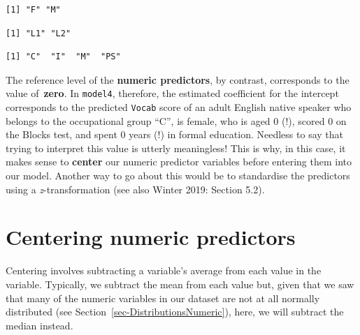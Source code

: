 \documentclass[
  letterpaper,
  DIV=11,
  numbers=noendperiod]{scrreprt}
\newenvironment{Shaded}{\begin{snugshade}}{\end{snugshade}}
\newcommand{\CommentTok}[1]{\textcolor[rgb]{0.37,0.37,0.37}{#1}}
\newcommand{\FunctionTok}[1]{\textcolor[rgb]{0.28,0.35,0.67}{#1}}
\newcommand{\NormalTok}[1]{\textcolor[rgb]{0.00,0.23,0.31}{#1}}
\newcommand{\SpecialCharTok}[1]{\textcolor[rgb]{0.37,0.37,0.37}{#1}}
\begin{document}
\begin{verbatim}
[1] "F" "M"
\end{verbatim}

\begin{Shaded}
\end{Shaded}

\begin{verbatim}
[1] "L1" "L2"
\end{verbatim}

\begin{Shaded}
\end{Shaded}

\begin{verbatim}
[1] "C"  "I"  "M"  "PS"
\end{verbatim}

The reference level of the \textbf{numeric predictors}, by contrast,
corresponds to the value of~\textbf{zero}. In \texttt{model4},
therefore, the estimated coefficient for the intercept corresponds to
the predicted \texttt{Vocab} score of an adult English native speaker
who belongs to the occupational group ``C'', is female, who is aged 0
(!), scored 0 on the Blocks test, and spent 0 years (!) in formal
education. Needless to say that trying to interpret this value is
utterly meaningless! This is why, in this case, it makes sense to
\textbf{center} our numeric predictor variables before entering them
into our model. Another way to go about this would be to standardise the
predictors using a \emph{z}-transformation (see also Winter 2019:
Section 5.2).

\section{Centering numeric predictors}\label{sec-Centering}

Centering involves subtracting a variable's average from each value in
the variable. Typically, we subtract the mean from each value but, given
that we saw that many of the numeric variables in our dataset are not at
all normally distributed (see Section~\ref{sec-DistributionsNumeric}),
here, we will subtract the median instead.
\end{document}
